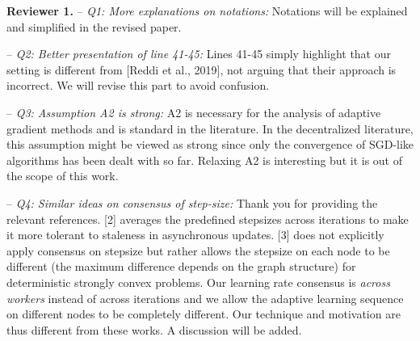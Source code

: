 \documentclass{article}
\begin{document}
\vspace{-2pt}


\textbf{Reviewer 1.} 
-- \textit{Q1: More explanations on notations:} 
Notations will be explained and simplified in the revised paper.\vspace{-5pt}

-- \textit{Q2: Better presentation of line 41-45:} Lines 41-45 simply highlight that our setting is different from  [Reddi et al., 2019], not arguing that their approach is incorrect. We will revise this part to avoid confusion.\vspace{-5pt}

-- \textit{Q3: Assumption A2 is strong:}
A2 is necessary for the analysis of adaptive gradient methods and is standard in the literature.
In the decentralized literature, this assumption might be viewed as strong since only the convergence of SGD-like algorithms has been dealt with so far.
Relaxing A2 is interesting but it is out of the scope of this work. \vspace{-5pt}

-- \textit{Q4: Similar ideas on consensus of step-size:}
Thank you for providing the relevant references. 
[2] averages the predefined stepsizes across iterations to make it more tolerant to staleness in asynchronous updates.  
[3] does not explicitly apply consensus on stepsize but rather allows the stepsize on each node to be different (the maximum difference depends on the graph structure) for deterministic strongly convex problems. 
Our learning rate consensus is \emph{across workers} instead of across iterations and we allow the adaptive learning sequence on different nodes to be completely different. 
Our technique and motivation are thus different from these works. 
A discussion will be added.
\end{document}
